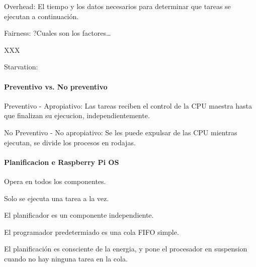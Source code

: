 \documentclass[12pt]{report} %
\begin{document}
Overhead: El tiempo y los datos necesarios para determinar que tareas se ejecutan  a continuación.

Fairness: ?Cuales son los factores\dots

XXX


Starvation:

\paragraph{Preventivo vs. No preventivo}

Preventivo - Apropiativo: Las tareas reciben el control de la CPU maestra hasta que finalizan su ejecucion, independientemente.

No Preventivo - No apropiativo: Se les puede expulsar de las CPU mientras ejecutan, se divide los procesos en rodajas.


\paragraph{Planificacion e Raspberry Pi OS}

Opera en todos los componentes.

Solo se ejecuta una tarea a la vez.

El planificador es un componente independiente.

El programador predetermiado es una cola FIFO simple.

El planificación es consciente de la energia, y pone el procesador en suspension cuando no hay ninguna tarea en la cola.





%
\end{document}
